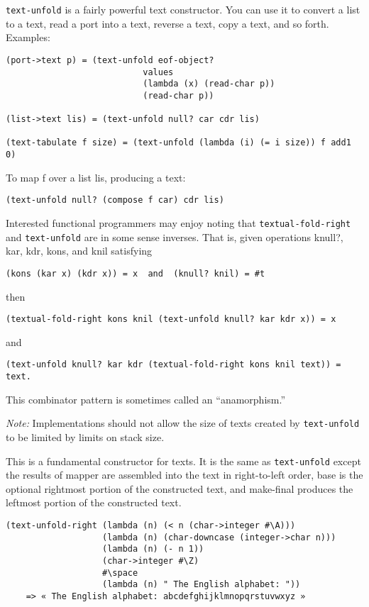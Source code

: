 \begin{description}
\texttt{text-unfold} is a fairly powerful text constructor. You can use
it to convert a list to a text, read a port into a text, reverse a text,
copy a text, and so forth. Examples:

\begin{verbatim}
(port->text p) = (text-unfold eof-object?
                           values
                           (lambda (x) (read-char p))
                           (read-char p))

(list->text lis) = (text-unfold null? car cdr lis)

(text-tabulate f size) = (text-unfold (lambda (i) (= i size)) f add1 0)
\end{verbatim}

To map f over a list lis, producing a text:

\begin{verbatim}
(text-unfold null? (compose f car) cdr lis)
\end{verbatim}

Interested functional programmers may enjoy noting that
\texttt{textual-fold-right} and \texttt{text-unfold} are in some sense
inverses. That is, given operations knull?, kar, kdr, kons, and knil
satisfying

\begin{verbatim}
(kons (kar x) (kdr x)) = x  and  (knull? knil) = #t
\end{verbatim}

then

\begin{verbatim}
(textual-fold-right kons knil (text-unfold knull? kar kdr x)) = x
\end{verbatim}

and

\begin{verbatim}
(text-unfold knull? kar kdr (textual-fold-right kons knil text)) = text.
\end{verbatim}

This combinator pattern is sometimes called an ``anamorphism.''

\emph{Note:} Implementations should not allow the size of texts created
by \texttt{text-unfold} to be limited by limits on stack size.
\item[ \href{}{} \texttt{text-unfold-right} stop? mapper successor seed
{[}base make-final{]} → text ]
This is a fundamental constructor for texts. It is the same as
\texttt{text-unfold} except the results of mapper are assembled into the
text in right-to-left order, base is the optional rightmost portion of
the constructed text, and make-final produces the leftmost portion of
the constructed text.

\begin{verbatim}
(text-unfold-right (lambda (n) (< n (char->integer #\A)))
                   (lambda (n) (char-downcase (integer->char n)))
                   (lambda (n) (- n 1))
                   (char->integer #\Z)
                   #\space
                   (lambda (n) " The English alphabet: "))
    => « The English alphabet: abcdefghijklmnopqrstuvwxyz »
\end{verbatim}
\end{description}

